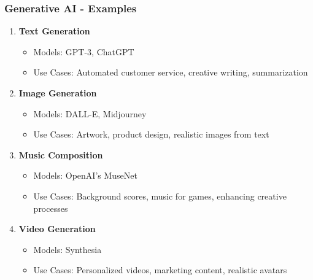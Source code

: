 \documentclass[aspectratio=169]{beamer}
\begin{document}
\begin{frame}
    \frametitle{Generative AI - Examples}
    \begin{enumerate}
        \item \textbf{Text Generation}
            \begin{itemize}
                \item Models: GPT-3, ChatGPT
                \item Use Cases: Automated customer service, creative writing, summarization
            \end{itemize}
        \item \textbf{Image Generation}
            \begin{itemize}
                \item Models: DALL-E, Midjourney
                \item Use Cases: Artwork, product design, realistic images from text
            \end{itemize}
        \item \textbf{Music Composition}
            \begin{itemize}
                \item Models: OpenAI's MuseNet
                \item Use Cases: Background scores, music for games, enhancing creative processes
            \end{itemize}
        \item \textbf{Video Generation}
            \begin{itemize}
                \item Models: Synthesia
                \item Use Cases: Personalized videos, marketing content, realistic avatars
            \end{itemize}
    \end{enumerate}
\end{frame}
\end{document}
